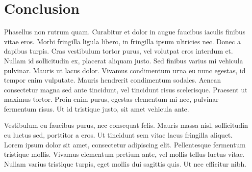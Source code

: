 
\chapter{Conclusion}\label{cpt:con}

Phasellus non rutrum quam. Curabitur et dolor in augue faucibus iaculis finibus vitae eros. Morbi fringilla ligula libero, in fringilla ipsum ultricies nec. Donec a dapibus turpis. Cras vestibulum tortor purus, vel volutpat eros interdum et. Nullam id sollicitudin ex, placerat aliquam justo. Sed finibus varius mi vehicula pulvinar. Mauris ut lacus dolor. Vivamus condimentum urna eu nunc egestas, id tempor enim vulputate. Mauris hendrerit condimentum sodales. Aenean consectetur magna sed ante tincidunt, vel tincidunt risus scelerisque. Praesent ut maximus tortor. Proin enim purus, egestas elementum mi nec, pulvinar fermentum risus. Ut id tristique justo, sit amet vehicula ante.

Vestibulum eu faucibus purus, nec consequat felis. Mauris massa nisl, sollicitudin eu luctus sed, porttitor a eros. Ut tincidunt sem vitae lacus fringilla aliquet. Lorem ipsum dolor sit amet, consectetur adipiscing elit. Pellentesque fermentum tristique mollis. Vivamus elementum pretium ante, vel mollis tellus luctus vitae. Nullam varius tristique turpis, eget mollis dui sagittis quis. Ut nec efficitur nibh.